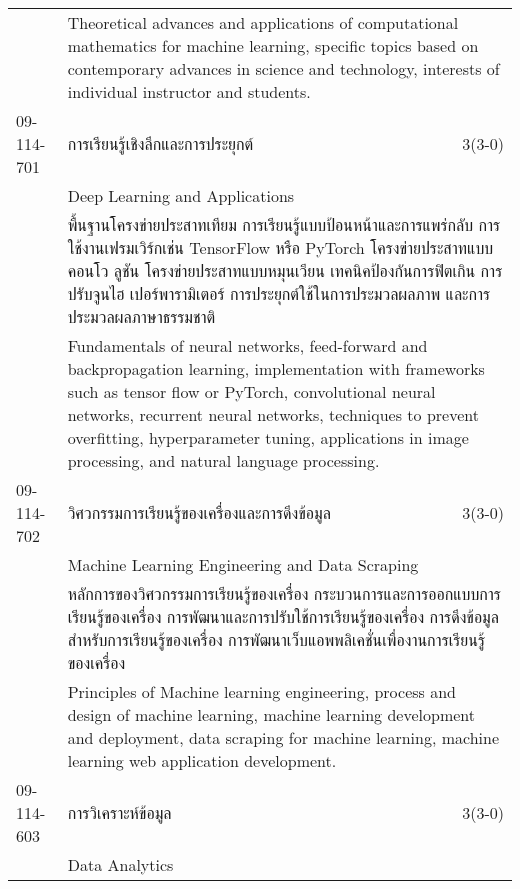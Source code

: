 \begin{longtable}{p{}p{}r{}}
&  \multicolumn{2}{p{0.75\textwidth}}{Theoretical advances and applications of computational mathematics for machine learning, specific topics based on contemporary advances in science and technology, interests of individual instructor and students.} \vspace{8mm} \\*
09-114-701 & การเรียนรู้เชิงลึกและการประยุกต์   & 3(3-0)\\*
 & Deep Learning and Applications & \phantom{x} \vspace{3mm} \\*
&  \multicolumn{2}{p{0.75\textwidth}}{พื้นฐานโครงข่ายประสาทเทียม การเรียนรู้แบบป้อนหน้าและการแพร่กลับ การใช้งานเฟรมเวิร์กเช่น TensorFlow หรือ PyTorch โครงข่ายประสาทแบบคอนโว ลูชัน โครงข่ายประสาทแบบหมุนเวียน เทคนิคป้องกันการฟิตเกิน การปรับจูนไฮ เปอร์พารามิเตอร์ การประยุกต์ใช้ในการประมวลผลภาพ และการประมวลผลภาษาธรรมชาติ} \vspace{3mm} \\*
&  \multicolumn{2}{p{0.75\textwidth}}{Fundamentals of neural networks, feed-forward and backpropagation learning, implementation with frameworks such as tensor flow or PyTorch, convolutional neural networks, recurrent neural networks, techniques to prevent overfitting, hyperparameter tuning, applications in image processing, and natural language processing.} \vspace{8mm} \\*
09-114-702 & วิศวกรรมการเรียนรู้ของเครื่องและการดึงข้อมูล & 3(3-0)\\*
 & Machine Learning Engineering and Data Scraping & \phantom{x} \vspace{3mm} \\*
&  \multicolumn{2}{p{0.75\textwidth}}{หลักการของวิศวกรรมการเรียนรู้ของเครื่อง กระบวนการและการออกแบบการเรียนรู้ของเครื่อง การพัฒนาและการปรับใช้การเรียนรู้ของเครื่อง การดึงข้อมูลสำหรับการเรียนรู้ของเครื่อง การพัฒนาเว็บแอพพลิเคชั่นเพื่องานการเรียนรู้ของเครื่อง } \vspace{3mm} \\*
&  \multicolumn{2}{p{0.75\textwidth}}{Principles of Machine learning engineering, process and design of machine learning, machine learning development and deployment, data scraping for machine learning, machine learning web application development.} \vspace{8mm} \\*
09-114-603 & การวิเคราะห์ข้อมูล & 3(3-0)\\*
 & Data Analytics & \phantom{x} \vspace{3mm} \\*

\end{longtable}
